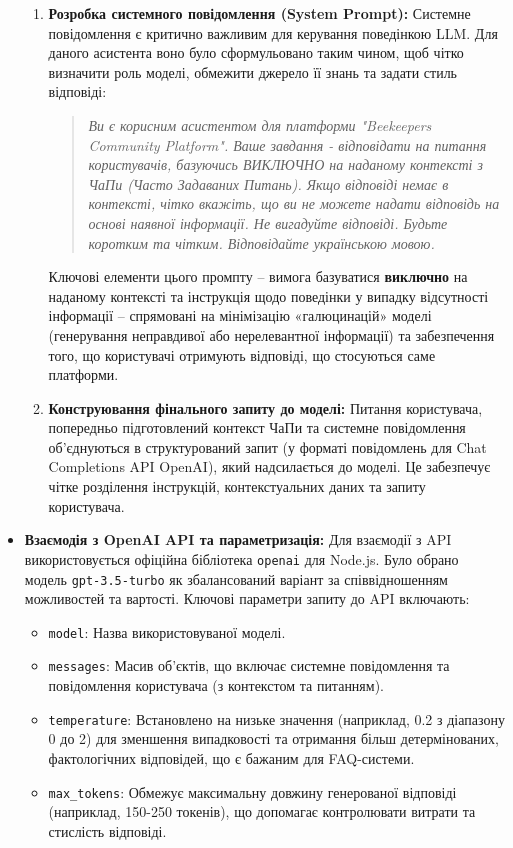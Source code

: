 \begin{itemize}
\begin{enumerate}
        \item \textbf{Розробка системного повідомлення (System Prompt):} Системне повідомлення є критично важливим для керування поведінкою LLM. Для даного асистента воно було сформульовано таким чином, щоб чітко визначити роль моделі, обмежити джерело її знань та задати стиль відповіді:
        \begin{quote}
        \textit{Ви є корисним асистентом для платформи "Beekeepers Community Platform". Ваше завдання - відповідати на питання користувачів, базуючись ВИКЛЮЧНО на наданому контексті з ЧаПи (Часто Задаваних Питань). Якщо відповіді немає в контексті, чітко вкажіть, що ви не можете надати відповідь на основі наявної інформації. Не вигадуйте відповіді. Будьте коротким та чітким. Відповідайте українською мовою.}
        \end{quote}
        Ключові елементи цього промпту – вимога базуватися \textbf{виключно} на наданому контексті та інструкція щодо поведінки у випадку відсутності інформації – спрямовані на мінімізацію «галюцинацій» моделі (генерування неправдивої або нерелевантної інформації) та забезпечення того, що користувачі отримують відповіді, що стосуються саме платформи.
        
        \item \textbf{Конструювання фінального запиту до моделі:} Питання користувача, попередньо підготовлений контекст ЧаПи та системне повідомлення об'єднуються в структурований запит (у форматі повідомлень для Chat Completions API OpenAI), який надсилається до моделі. Це забезпечує чітке розділення інструкцій, контекстуальних даних та запиту користувача.
    \end{enumerate}

    \item \textbf{Взаємодія з OpenAI API та параметризація:}
    Для взаємодії з API використовується офіційна бібліотека \texttt{openai} для Node.js. Було обрано модель \texttt{gpt-3.5-turbo} як збалансований варіант за співвідношенням можливостей та вартості. Ключові параметри запиту до API включають:
    \begin{itemize}
        \item \texttt{model}: Назва використовуваної моделі.
        \item \texttt{messages}: Масив об'єктів, що включає системне повідомлення та повідомлення користувача (з контекстом та питанням).
        \item \texttt{temperature}: Встановлено на низьке значення (наприклад, 0.2 з діапазону 0 до 2) для зменшення випадковості та отримання більш детермінованих, фактологічних відповідей, що є бажаним для FAQ-системи.
        \item \texttt{max\_tokens}: Обмежує максимальну довжину генерованої відповіді (наприклад, 150-250 токенів), що допомагає контролювати витрати та стислість відповіді.
    \end{itemize}
    

\end{itemize}
